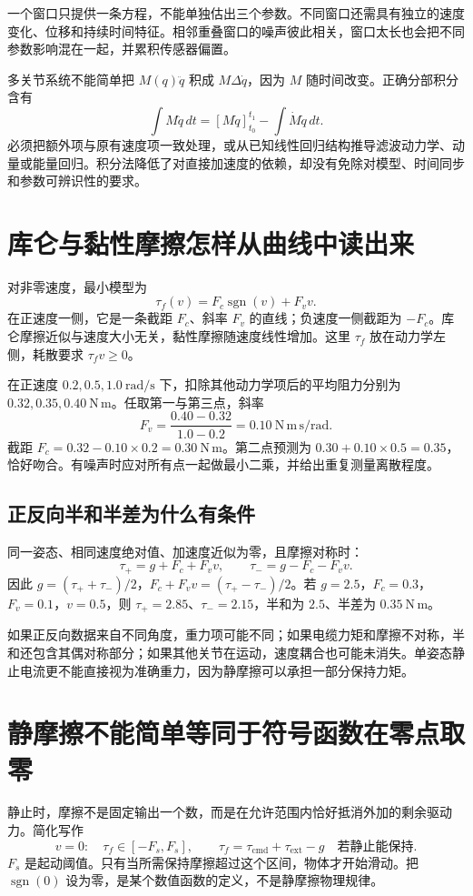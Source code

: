 一个窗口只提供一条方程，不能单独估出三个参数。不同窗口还需具有独立的速度变化、位移和持续时间特征。相邻重叠窗口的噪声彼此相关，窗口太长也会把不同参数影响混在一起，并累积传感器偏置。

多关节系统不能简单把 $M(q)\ddot q$ 积成 $M\Delta\dot q$，因为 $M$ 随时间改变。正确分部积分含有
\[
 \int M\ddot q\,dt=[M\dot q]_{t_0}^{t_1}-\int\dot M\dot q\,dt.
\]
必须把额外项与原有速度项一致处理，或从已知线性回归结构推导滤波动力学、动量或能量回归。积分法降低了对直接加速度的依赖，却没有免除对模型、时间同步和参数可辨识性的要求。

\section{库仑与黏性摩擦怎样从曲线中读出来}
对非零速度，最小模型为
\begin{equation}
 \tau_f(v)=F_c\operatorname{sgn}(v)+F_vv.
\end{equation}
在正速度一侧，它是一条截距 $F_c$、斜率 $F_v$ 的直线；负速度一侧截距为 $-F_c$。库仑摩擦近似与速度大小无关，黏性摩擦随速度线性增加。这里 $\tau_f$ 放在动力学左侧，耗散要求 $\tau_fv\ge0$。

\begin{examplebox}[算例 9D 通过三种速度辨识摩擦直线]
在正速度 $0.2,0.5,1.0\ \mathrm{rad/s}$ 下，扣除其他动力学项后的平均阻力分别为 $0.32,0.35,0.40\ \mathrm{N\,m}$。任取第一与第三点，斜率
\[
 F_v=\frac{0.40-0.32}{1.0-0.2}=0.10\ \mathrm{N\,m\,s/rad}.
\]
截距 $F_c=0.32-0.10\times0.2=0.30\ \mathrm{N\,m}$。第二点预测为 $0.30+0.10\times0.5=0.35$，恰好吻合。有噪声时应对所有点一起做最小二乘，并给出重复测量离散程度。
\end{examplebox}

\subsection{正反向半和半差为什么有条件}
同一姿态、相同速度绝对值、加速度近似为零，且摩擦对称时：
\[
 \tau_+=g+F_c+F_vv,\qquad\tau_-=g-F_c-F_vv.
\]
因此 $g=(\tau_++\tau_-)/2$，$F_c+F_vv=(\tau_+-\tau_-)/2$。若 $g=2.5$，$F_c=0.3$，$F_v=0.1$，$v=0.5$，则 $\tau_+=2.85$、$\tau_-=2.15$，半和为 $2.5$、半差为 $0.35\ \mathrm{N\,m}$。

如果正反向数据来自不同角度，重力项可能不同；如果电缆力矩和摩擦不对称，半和还包含其偶对称部分；如果其他关节在运动，速度耦合也可能未消失。单姿态静止电流更不能直接视为准确重力，因为静摩擦可以承担一部分保持力矩。

\section{静摩擦不能简单等同于符号函数在零点取零}
静止时，摩擦不是固定输出一个数，而是在允许范围内恰好抵消外加的剩余驱动力。简化写作
\begin{equation}
 v=0:\quad\tau_f\in[-F_s,F_s],\qquad
 \tau_f=\tau_{\mathrm{cmd}}+\tau_{\mathrm{ext}}-g\quad\text{若静止能保持}.
\end{equation}
$F_s$ 是起动阈值。只有当所需保持摩擦超过这个区间，物体才开始滑动。把 $\operatorname{sgn}(0)$ 设为零，是某个数值函数的定义，不是静摩擦物理规律。

